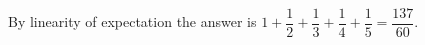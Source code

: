 By linearity of expectation the answer is $1+\dfrac12+\dfrac13+\dfrac14+\dfrac15=\boxed{\dfrac{137}{60}}$.
